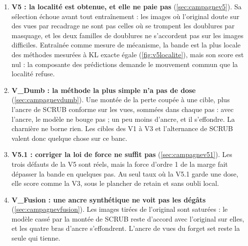\documentclass[11pt,a4paper]{article}
\begin{document}
\begin{enumerate}[leftmargin=1.6em,itemsep=2pt]
    exacte, comme la V3). L'ancre croisée freine l'oubli partout sans le localiser ; la contrainte
    active ne lie pas, et poursuivre la V3 sur tout son calendrier divise son score par deux.
  \item \textbf{V5 : la localité est obtenue, et elle ne paie pas} (\cref{sec:campagnev5}). Sa
    sélection échoue avant tout entraînement : les images où l'original doute sur des vues par
    recadrage ne sont pas celles où se trompent les doublures par masquage, et les deux familles de
    doublures ne s'accordent pas sur les images difficiles. Entraînée comme mesure de mécanisme, la
    bande est la plus locale des méthodes mesurées à KL exacte égale (\cref{fig:v5localite}), mais son
    score est nul : la composante des prédictions demande le mouvement commun que la localité refuse.
  \item \textbf{V\_Dumb : la méthode la plus simple n'a pas de dose} (\cref{sec:campagnevdumb}). Une
    montée de la perte coupée à une cible, plus l'ancre de SCRUB conforme sur les vues, sommées dans
    chaque pas : avec l'ancre, le modèle ne bouge pas ; un peu moins d'ancre, et il s'effondre. La
    charnière ne borne rien. Les cibles des V1 à V3 et l'alternance de SCRUB valent donc quelque chose
    sur ce banc.
  \item \textbf{V5.1 : corriger la loi de force ne suffit pas} (\cref{sec:campagnev51}). Les trois
    défauts de la V5 sont réels, mais la force d'ordre 1 de la marge fait dépasser la bande en
    quelques pas. Au seul taux où la V5.1 garde une dose, elle score comme la V3, sous le plancher de
    retain et sans oubli local.
  \item \textbf{V\_Fusion : une ancre synthétique ne voit pas les dégâts} (\cref{sec:campagnevfusion}).
    Les images tirées de l'original sont saturées : le modèle cassé par la montée de SCRUB reste
    d'accord avec l'original sur elles, et les quatre bras d'ancre s'effondrent. L'ancre de vues du
    forget set reste la seule qui tienne.
\end{enumerate}
\end{document}
